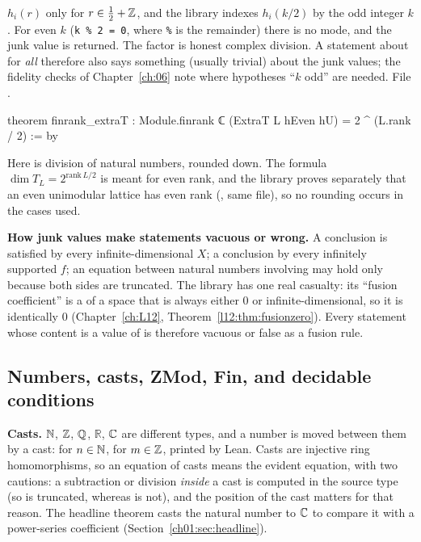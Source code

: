 $h_i(r)$ only for $r\in\frac12+{\mathbb{Z}}$, and the library indexes $h_i(k/2)$ by the odd integer $k$. For
even $k$ (\texttt{k \% 2 = 0}, where \texttt{\%} is the remainder) there is no mode, and the junk value
 is returned. The factor  is honest complex division. A statement about
 for \emph{all}  therefore also says something (usually trivial) about the junk
values; the fidelity checks of Chapter~\ref{ch:06} note where hypotheses ``$k$ odd'' are needed.
\noindent File .
\begin{leancode}
theorem finrank_extraT : Module.finrank ℂ (ExtraT L hEven hU) = 2 ^ (L.rank / 2) := by
\end{leancode}
Here  is division of natural numbers, rounded down. The formula $\dim T_L =
2^{\mathrm{rank}\,L/2}$ is meant for even rank, and the library proves separately that an even
unimodular lattice has even rank (, same file), so no rounding occurs
in the cases used.

\begin{warning}
\textbf{How junk values make statements vacuous or wrong.} A conclusion
 is satisfied by every infinite-dimensional $X$; a conclusion
 by every infinitely supported $f$; an equation between natural numbers involving
 may hold only because both sides are truncated. The library has one real casualty: its
``fusion coefficient''  is a  of a space that is always either
$0$ or infinite-dimensional, so it is identically $0$ (Chapter~\ref{ch:L12},
Theorem~\ref{l12:thm:fusionzero}). Every statement
whose content is a value of  is therefore vacuous or false as a fusion rule.
\end{warning}

\subsection{Numbers, casts, ZMod, Fin, and decidable conditions}\label{ch01:sec:numbers}

\textbf{Casts.} ${\mathbb{N}}$, ${\mathbb{Z}}$, ${\mathbb{Q}}$, $\mathbb R$, ${\mathbb{C}}$ are different types, and a number is moved between
them by a cast:  for $n\in{\mathbb{N}}$,  for $m\in{\mathbb{Z}}$, printed  by Lean.
Casts are injective ring homomorphisms, so an equation of casts means the evident equation, with two
cautions: a subtraction or division \emph{inside} a cast is computed in the source type (so
 is truncated, whereas  is not), and the position of the
cast matters for that reason. The headline theorem casts the natural number  to ${\mathbb{C}}$ to
compare it with a power-series coefficient (Section~\ref{ch01:sec:headline}).

